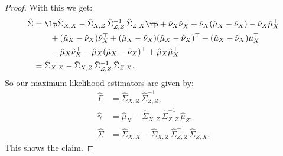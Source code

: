 \begin{Lem}
\begin{proof}
With this we get:
\begin{align*}
    \hat \Sigma &= \lp \hat\Sigma_{X,X} -\hat\Sigma_{X,Z}\,\hat\Sigma_{Z,Z}^{-1}\,\hat\Sigma_{Z,X} \rp 
     + \hat\nu_X\hat\nu_X^\top + \hat\nu_X (\hat\mu_X-\hat\nu_X) - \hat\nu_X\hat\mu_X^\top \\ 
    &\qquad + (\hat\mu_X-\hat\nu_X) \hat\nu_X^\top + (\hat\mu_X-\hat\nu_X)(\hat\mu_X-\hat\nu_X)^\top - 
    (\hat\mu_X-\hat\nu_X) \mu_X^\top  \\
    &\qquad - \hat\mu_X \hat\nu_X^\top - \hat\mu_X (\hat\mu_X-\hat\nu_X)^\top  + \hat\mu_X\hat\mu_X^\top\\
    & =\hat\Sigma_{X,X} -\hat\Sigma_{X,Z}\,\hat\Sigma_{Z,Z}^{-1}\,\hat\Sigma_{Z,X}.
\end{align*}
So our maximum likelihood estimators are given by:
\begin{align*}
    \hat\Gamma & = \hat\Sigma_{X,Z} \,\hat\Sigma_{Z,Z}^{-1}, \\
    \hat\gamma & = \hat \mu_X - \hat\Sigma_{X,Z} \,\hat\Sigma_{Z,Z}^{-1}\,\hat\mu_Z, \\
    \hat \Sigma &= \hat\Sigma_{X,X} -\hat\Sigma_{X,Z}\,\hat\Sigma_{Z,Z}^{-1}\,\hat\Sigma_{Z,X}.
\end{align*}
This shows the claim.
    \end{proof}
\end{Lem}


